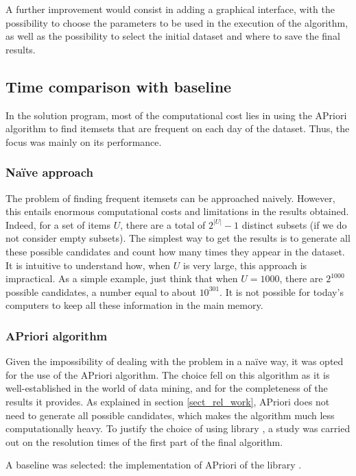 A further improvement would consist in adding a graphical interface, with the possibility to choose the parameters to be used in the execution of the algorithm, as well as the possibility to select the initial dataset and where to save the final results.

\subsection*{Time comparison with baseline}

In the solution program, most of the computational cost lies in using the APriori algorithm to find itemsets that are frequent on each day of the dataset. Thus, the focus was mainly on its performance.

\subsubsection*{Naïve approach}
The problem of finding frequent itemsets can be approached naively. However, this entails enormous computational costs and limitations in the results obtained. Indeed, for a set of items $U$, there are a total of $2^{|U|}-1$ distinct subsets (if we do not consider empty subsets). The simplest way to get the results is to generate all these possible candidates and count how many times they appear in the dataset. It is intuitive to understand how, when $U$ is very large, this approach is impractical. As a simple example, just think that when $U = 1000$, there are $2^{1000}$ possible candidates, a number equal to about $10^{301}$. It is not possible for today's computers to keep all these information in the main memory.

\subsubsection*{APriori algorithm}
Given the impossibility of dealing with the problem in a naïve way, it was opted for the use of the APriori algorithm. The choice fell on this algorithm as it is well-established in the world of data mining, and for the completeness of the results it provides. As explained in section \ref{sect_rel_work}, APriori does not need to generate all possible candidates, which makes the algorithm much less computationally heavy. To justify the choice of using library , a study was carried out on the resolution times of the first part of the final algorithm.

A baseline was selected: the implementation of APriori of the library \cite{eff_apr}.

